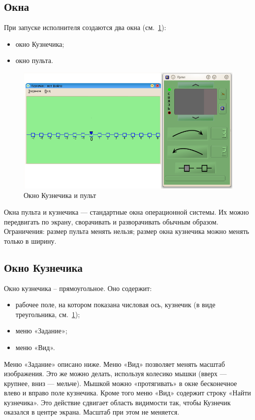 \subsection{Окна}

При запуске исполнителя создаются два окна (см.~\ref{kuznechik}):
\begin{itemize}
\item окно Кузнечика;
\item окно пульта.
\end{itemize}
\begin{figure}[h]
	\begin{center}
		\includegraphics[scale=0.6]{kuznechik.png}
	\end{center}
	\caption{Окно Кузнечика и пульт}
\label{kuznechik}
\end{figure}

Окна пульта и кузнечика --- стандартные окна операционной системы. Их можно передвигать по экрану, сворачивать и разворачивать обычным образом. Ограничения: размер пульта менять нельзя; размер окна кузнечика можно менять только в ширину. 


\subsection{Окно Кузнечика}

Окно кузнечика – прямоугольное. Оно содержит:
\begin{itemize}
\item рабочее поле, на котором показана числовая ось, кузнечик (в виде треугольника, см.~\ref{kuznechik});
\item меню «Задание»;
\item меню «Вид».
\end{itemize}

Меню «Задание» описано ниже. Меню «Вид» позволяет менять масштаб изображения. Это же можно делать, используя колесико мышки (вверх --- крупнее, вниз --- мельче). Мышкой можно «протягивать» в окне бесконечное влево и вправо поле кузнечика. Кроме того меню «Вид» содержит строку «Найти кузнечика». Это действие сдвигает область видимости так, чтобы Кузнечик оказался в центре экрана. Масштаб при этом не меняется.

